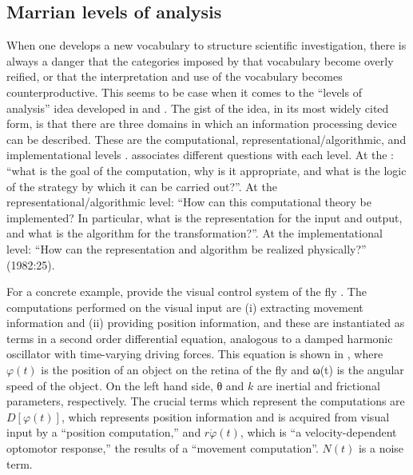 \subsection{Marrian levels of analysis}

When one develops a new vocabulary to structure scientific investigation, there is always a danger that the categories imposed by that vocabulary become overly reified, or that the interpretation and use of the vocabulary becomes counterproductive. This seems to be case when it comes to the “levels of analysis” idea developed in \citet{Marr1982} and \citet{MarrPoggio1977}. The gist of the idea, in its most widely cited form, is that there are three domains in which an information processing device can be described. These are the computational, representational/algorithmic, and implementational levels \citep{Marr1982}. \citet{Marr1982} associates different questions with each level. At the : “what is the goal of the computation, why is it appropriate, and what is the logic of the strategy by which it can be carried out?”. At the representational/algorithmic level: “How can this computational theory be implemented? In particular, what is the representation for the input and output, and what is the algorithm for the transformation?”. At the implementational level: “How  can the representation and algorithm be realized physically?” (1982:25).

  For a concrete example, \citet{MarrPoggio1977} provide the visual control system of the fly \citep{ReichardtPoggio1976}. The computations performed on the visual input are (i) extracting movement information and (ii) providing position information, and these are instantiated as terms in a second order differential equation, analogous to a damped harmonic oscillator with time-varying driving forces. This equation is shown in , where  $\varphi(t)$ is the position of an object on the retina of the fly and ω(t) is the angular speed of the object. On the left hand side, θ and $k$ are inertial and frictional parameters, respectively. The crucial terms which represent the computations are  $D\left[\varphi \left(t\right)\right]$, which represents position information and is acquired from visual input by a “position computation,” and  $r\Dot{{\varphi} }\left(t\right)$, which is “a velocity-dependent optomotor response,” the results of a “movement computation”. $N(t)$ is a noise term.


